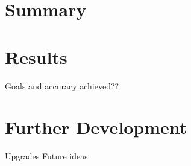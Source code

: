 \section{Summary}

\section{Results}
Goals and accuracy achieved??

\section{Further Development}
Upgrades
Future ideas